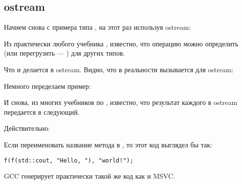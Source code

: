 \subsection{ostream}

Начнем снова с примера типа , на этот раз используя ostream:



Из практически любого учебника \Cpp, известно, что операцию \TT{<<} можно определить 
(или перегрузить --- ) для других типов.

Что и делается в ostream.
Видно, что в реальности вызывается  для ostream:



Немного переделаем пример:



И снова, из многих учебников по \Cpp, известно, что результат каждого  
в ostream передается в следующий.

Действительно:



Если переименовать название метода  в \ttf{}, то этот код выглядел бы так:

\begin{lstlisting}
f(f(std::cout, "Hello, "), "world!");
\end{lstlisting}

GCC генерирует практически такой же код как и MSVC.

